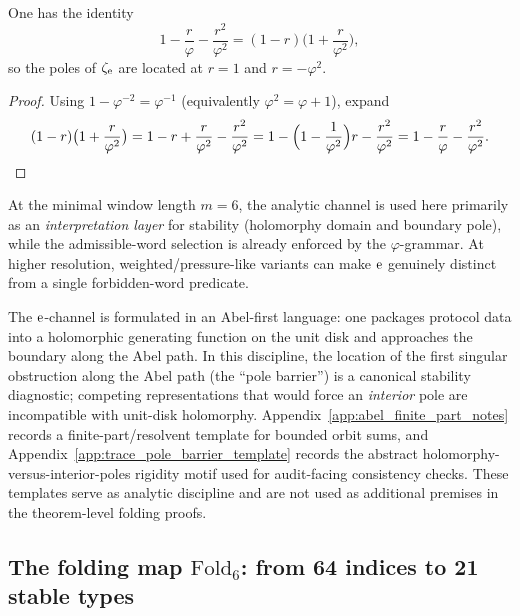 \begin{lemma}\label{lem:golden_normalization_factorization}
One has the identity
\[
1-\frac{r}{\varphi}-\frac{r^2}{\varphi^2}=(1-r)\bigl(1+\frac{r}{\varphi^2}\bigr),
\]
so the poles of $\zeta_{\mathrm{e}}$ are located at $r=1$ and $r=-\varphi^{2}$.
\end{lemma}
\begin{proof}
Using $1-\varphi^{-2}=\varphi^{-1}$ (equivalently $\varphi^2=\varphi+1$), expand
\[
(1-r)\bigl(1+\frac{r}{\varphi^2}\bigr)=1-r+\frac{r}{\varphi^2}-\frac{r^2}{\varphi^2}
=1-\Bigl(1-\frac{1}{\varphi^2}\Bigr)r-\frac{r^2}{\varphi^2}
=1-\frac{r}{\varphi}-\frac{r^2}{\varphi^2}.
\]
\end{proof}

\begin{remark}\label{rem:e_channel_distinct}
At the minimal window length $m=6$, the analytic channel is used here primarily as an \emph{interpretation layer} for stability (holomorphy domain and boundary pole), while the admissible-word selection is already enforced by the $\varphi$-grammar.
At higher resolution, weighted/pressure-like variants can make $\mathrm{e}$ genuinely distinct from a single forbidden-word predicate.
\end{remark}
\begin{remark}\label{rem:abel_first_pole_barrier_discipline}
\AuditTag The $\mathrm{e}$-channel is formulated in an Abel-first language: one packages protocol data into a holomorphic generating function on the unit disk and approaches the boundary along the Abel path.
In this discipline, the location of the first singular obstruction along the Abel path (the ``pole barrier'') is a canonical stability diagnostic; competing representations that would force an \emph{interior} pole are incompatible with unit-disk holomorphy.
Appendix~\ref{app:abel_finite_part_notes} records a finite-part/resolvent template for bounded orbit sums, and Appendix~\ref{app:trace_pole_barrier_template} records the abstract holomorphy-versus-interior-poles rigidity motif used for audit-facing consistency checks.
These templates serve as analytic discipline and are not used as additional premises in the theorem-level folding proofs.
\end{remark}

\subsection{The folding map \texorpdfstring{$\mathrm{Fold}_6$}{Fold6}: from 64 indices to 21 stable types}
\label{subsec:fold6_map}

